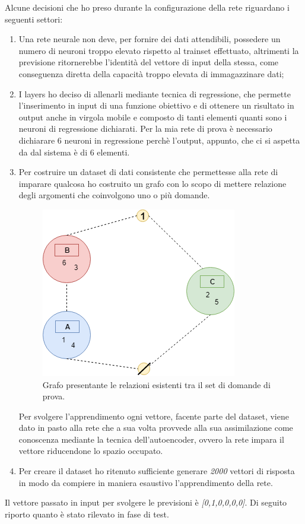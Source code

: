 \documentclass[11pt,a4paper,italian]{article}
\begin{document}
Alcune decisioni che ho preso durante la configurazione della rete riguardano i seguenti settori:
\begin{enumerate}
\item Una rete neurale non deve, per fornire dei dati attendibili, possedere un numero di neuroni troppo elevato rispetto al trainset effettuato, altrimenti la previsione  ritornerebbe l'identit\`a del vettore di input della stessa, come conseguenza diretta della capacit\`a troppo elevata di immagazzinare dati;
\item I layers ho deciso di allenarli mediante tecnica di regressione, che permette l'inserimento in input di una funzione obiettivo e di ottenere un risultato in output anche in virgola mobile e composto di tanti elementi quanti sono i neuroni di regressione dichiarati. Per la mia rete di prova \`e necessario dichiarare  6 neuroni in regressione perch\`e l'output, appunto, che ci si aspetta da dal sistema \`e di 6 elementi.
\item Per costruire un dataset di dati consistente che permettesse alla rete di imparare qualcosa ho costruito un grafo con lo scopo di mettere relazione degli argomenti che coinvolgono uno o pi\`u domande.
\begin{figure}[H]
\centering
	\includegraphics[width=0.60\linewidth]{image/grafo_trainset.png}
	\caption{Grafo presentante le relazioni esistenti tra il set di domande di prova.}
\end{figure}
\noindent
Per svolgere l'apprendimento ogni vettore, facente parte del dataset, viene dato in pasto alla rete che a sua volta provvede alla sua assimilazione come conoscenza mediante la tecnica dell'autoencoder, ovvero la rete impara il vettore riducendone lo spazio occupato.
\item Per creare il dataset ho ritenuto sufficiente generare \textit{2000} vettori di risposta in modo da compiere in maniera esaustivo l'apprendimento della rete.
\end{enumerate}
\noindent
Il vettore passato in input per svolgere le previsioni \`e \textit{[0,1,0,0,0,0]}. 
Di seguito riporto quanto \`e stato rilevato in  fase di test.
\end{document}
